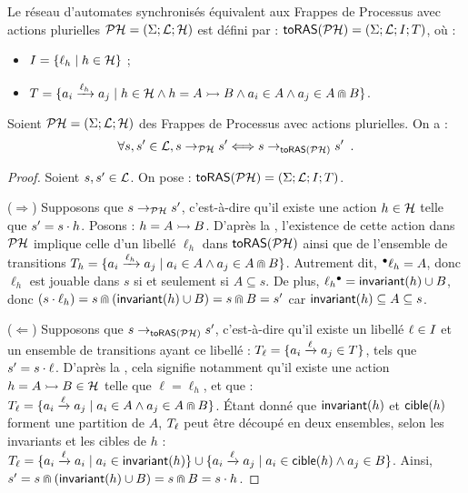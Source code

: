 \begin{definition}
  Le réseau d'automates synchronisés équivalent aux Frappes de Processus
  avec actions plurielles $\mathcal{PH} = (\Sigma; \mathcal{L}; \mathcal{H})$
  est défini par : $\mathsf{toRAS}(\mathcal{PH}) = (\Sigma; \mathcal{L}; I; T)$, où :
  \begin{itemize}
    \item $I = \{ \ell_h \mid h \in \mathcal{H} \}$ ; %
    \item $T = \{ a_i \xrightarrow{\ell_h} a_j \mid
      h \in \mathcal{H} \wedge h = \mbox{$A \rightarrowtail B$} \wedge a_i \in A \wedge a_j \in A \Cap B \}$.
  \end{itemize}
\end{definition}

\begin{theorem}[$\PH \approx \phmtoan$]
  Soient $\mathcal{PH} = (\Sigma; \mathcal{L}; \mathcal{H})$ des Frappes de Processus avec actions plurielles.
  On a :
  \[\forall s, s' \in \mathcal{L}, s \rightarrow_{\mathcal{PH}} s' \Longleftrightarrow s \rightarrow_{\mathsf{toRAS}(\mathcal{PH})} s' \enspace.\]
\end{theorem}

\begin{proof}
  Soient $s, s' \in \mathcal{L}$.
  On pose : $\mathsf{toRAS}(\mathcal{PH}) = (\Sigma; \mathcal{L}; I; T)$.
  
  ($\Rightarrow$) Supposons que $s \rightarrow_{\mathcal{PH}} s'$, c'est-à-dire qu'il existe une action $h \in \mathcal{H}$
    telle que $s' = s \cdot h$.
    Posons : $h = \mbox{$A \rightarrowtail B$}$.
    D'après la ,
    l'existence de cette action dans $\mathcal{PH}$ implique celle d'un libellé $\ell_h$ dans $\mathsf{toRAS}(\mathcal{PH})$
    ainsi que de l'ensemble de transitions
    $T_h = \{ a_i \xrightarrow{\ell_h} a_j \mid a_i \in A \wedge a_j \in A \Cap B \}$.
    Autrement dit, ${}^\bullet \ell_h = A$, donc $\ell_h$ est jouable dans $s$
    si et seulement si $A \subseteq s$.
    De plus, $\ell_h {}^\bullet = \mathsf{invariant}(h) \cup B$, donc
    $(s \cdot \ell_h) = s \Cap (\mathsf{invariant}(h) \cup B) = s \Cap B = s'$
    car $\mathsf{invariant}(h) \subseteq A \subseteq s$.
  
  ($\Leftarrow$) Supposons que $s \rightarrow_{\mathsf{toRAS}(\mathcal{PH})} s'$,
    c'est-à-dire qu'il existe un libellé $\ell \in I$ et un ensemble de transitions
    ayant ce libellé : $T_\ell = \{ a_i \xrightarrow{\ell} a_j \in T \}$,
    tels que $s' = s \cdot \ell$.
    D'après la , cela signifie notamment qu'il existe une action
    $h = \mbox{$A \rightarrowtail B$} \in \mathcal{H}$ telle que $\ell = \ell_h$, et que :
    $T_\ell = \{ a_i \xrightarrow{\ell} a_j \mid a_i \in A \wedge a_j \in A \Cap B \}$.
    Étant donné que $\mathsf{invariant}(h)$ et $\mathsf{cible}(h)$ forment une partition de $A$,
    $T_\ell$ peut être découpé en deux ensembles, selon les invariants et les cibles de $h$ :
    $T_\ell = \{ a_i \xrightarrow{\ell} a_i \mid a_i \in \mathsf{invariant}(h) \} \cup
      \{ a_i \xrightarrow{\ell} a_j \mid a_i \in \mathsf{cible}(h) \wedge a_j \in B \}$.
    Ainsi, $s' = s \Cap (\mathsf{invariant}(h) \cup B) = s \Cap B = s \cdot h$.
\end{proof}

